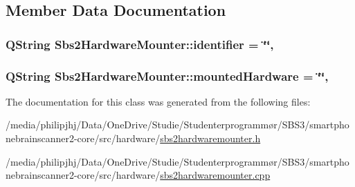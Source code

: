 \subsection{Member Data Documentation}
\hypertarget{classSbs2HardwareMounter_a00ac9b3100310ddf9615116c8d33af9c}{
\subsubsection[{identifier}]{\setlength{\rightskip}{0pt plus 5cm}Q\-String Sbs2\-Hardware\-Mounter\-::identifier = \char`\"{}\char`\"{}\hspace{0.3cm}{\ttfamily [static]}, {\ttfamily [protected]}}}\label{classSbs2HardwareMounter_a00ac9b3100310ddf9615116c8d33af9c}
\hypertarget{classSbs2HardwareMounter_a84df0b714f439793b05c23244b88fa4d}{
\subsubsection[{mounted\-Hardware}]{\setlength{\rightskip}{0pt plus 5cm}Q\-String Sbs2\-Hardware\-Mounter\-::mounted\-Hardware = \char`\"{}\char`\"{}\hspace{0.3cm}{\ttfamily [static]}, {\ttfamily [protected]}}}\label{classSbs2HardwareMounter_a84df0b714f439793b05c23244b88fa4d}


The documentation for this class was generated from the following files\-:\begin{DoxyCompactItemize}
\item 
/media/philipjhj/\-Data/\-One\-Drive/\-Studie/\-Studenterprogrammør/\-S\-B\-S3/smartphonebrainscanner2-\/core/src/hardware/\hyperlink{sbs2hardwaremounter_8h}{sbs2hardwaremounter.\-h}\item 
/media/philipjhj/\-Data/\-One\-Drive/\-Studie/\-Studenterprogrammør/\-S\-B\-S3/smartphonebrainscanner2-\/core/src/hardware/\hyperlink{sbs2hardwaremounter_8cpp}{sbs2hardwaremounter.\-cpp}\end{DoxyCompactItemize}
